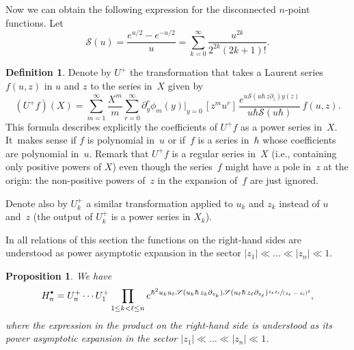 \documentclass[11pt]{article}
\newcommand{\ie}{i.e.,\xspace}
\let\mathcal\mathscr
\newcommand{\sbullet}{{\scriptscriptstyle\bullet}}
\newcommand{\csbullet}{{\raisebox{1pt}{$\sbullet$}}}
\theoremstyle{plain}
\newtheorem{proposition}[theorem]{Proposition}
\theoremstyle{definition}
\newtheorem{definition}[theorem]{Definition}
\theoremstyle{remark}
\newcommand{\cS}{\mathcal{S}}
\newcommand{\Hd}{H^\csbullet}
\begin{document}
Now we can obtain the following expression for the disconnected $n$-point functions. Let
\begin{equation*}
\cS(u)=\frac{e^{u/2}-e^{-u/2}}{u}=\sum_{k=0}^\infty\frac{u^{2k}}{2^{2k}(2k+1)!}.
\end{equation*}

\begin{definition}\label{def:U-operators}
Denote by $U^+$ the transformation that takes a Laurent series $f(u,z)$ in $u$ and $z$ to the series in~$X$ given by
\begin{equation}\label{eq:Uplusdef}
(U^+f)(X)=\sum_{m=1}^\infty \frac{X^{m}}{m}\sum_{r=0}^\infty
\partial_y^{r}\phi_{m}(y)\big|_{y=0}\,[z^mu^r]\,
\frac{e^{ u\cS(u\hbar\,z\partial_z)y(z) }}{u\hbar\cS(u\hbar)}\,f(u,z).
\end{equation}
This formula describes explicitly the coefficients of $U^+f$ as a power series in~$X$. It~makes sense if $f$ is polynomial in~$u$ or if~$f$ is a series in~$\hbar$ whose coefficients are polynomial in~$u$. Remark that $U^+f$ is a regular series in~$X$ (\ie containing only positive powers of $X$) even though the series~$f$ might have a pole in~$z$ at the origin: the non-positive powers of~$z$ in the expansion of~$f$ are just ignored.

Denote also by $U^+_k$ a similar transformation applied to $u_k$ and $z_k$ instead of $u$ and~$z$ (the output of $U^+_k$ is a power series in $X_k$).
\end{definition}

In all relations of this section
the functions on the right-hand sides are understood as power asymptotic expansion in the sector $|z_1|\ll\dots\ll|z_n|\ll1$.

\begin{proposition}\label{prop:HdU}
We have
\begin{equation}\label{eq:Hdprod}
\Hd_n=U^+_n\cdots U^+_1
\prod_{1\le k<\ell\le n}
e^{\hbar^2u_ku_\ell\cS(u_k\hbar\,z_k\partial_{z_k})\cS(u_\ell\hbar\,z_\ell \partial_{z_\ell})
\sfrac{z_k z_\ell}{(z_k-z_\ell)^2}},
\end{equation}
where the expression in the product on the right-hand side is understood as its power asymptotic expansion in the sector $|z_1|\ll\dots\ll|z_n|\ll1$.
\end{proposition}
\end{document}
